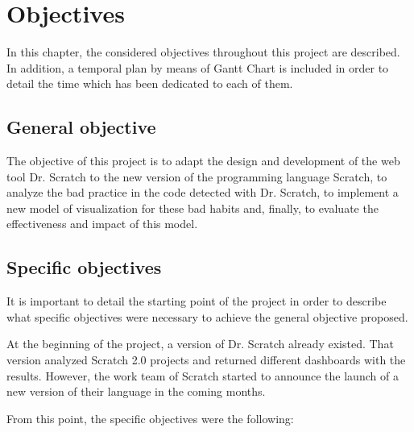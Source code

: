 

\cleardoublepage %
\chapter{Objectives} 
\label{chap:objectives} 

In this chapter, the considered objectives throughout this project are described. In addition, a temporal plan by means of Gantt Chart is included in order to detail the time which has been dedicated to each of them.

\section{General objective}
\label{sec:general-objective}

The objective of this project is to adapt the design and development of the web tool Dr. Scratch to the new version of the programming language Scratch, to analyze the bad practice in the code detected with Dr. Scratch, to implement a new model of visualization for these bad habits and, finally, to evaluate the effectiveness and impact of this model.



\section{Specific objectives}
\label{sec:specific-objectives}

It is important to detail the starting point of the project in order to describe what specific objectives were necessary to achieve the general objective proposed. 

At the beginning of the project, a version of Dr. Scratch already existed. That version analyzed Scratch 2.0 projects and returned different dashboards with the results. However, the work team of Scratch started to announce the launch of a new version of their language in the coming months. 

From this point, the specific objectives were the following:


